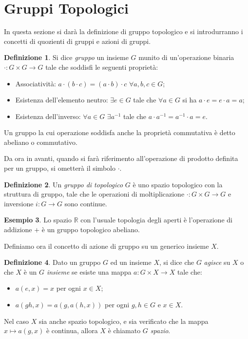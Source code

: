 \documentclass[12pt,a4paper]{report}
\theoremstyle{definition}
\newtheorem{Def}{Definizione}[chapter]
\theoremstyle{definition}
\newtheorem{Ex}[Def]{Esempio}
\theoremstyle{definition}
\theoremstyle{remark}
\begin{document}
\section{Gruppi Topologici}
In questa sezione si darà la definizione di gruppo topologico e si introdurranno i concetti di quozienti di gruppi e azioni di gruppi.
\begin{Def}
	Si dice \textit{gruppo} un insieme $G$ munito di un'operazione binaria $\cdot:G\times G\rightarrow G$ tale che soddisfi le seguenti proprietà:
	\begin{itemize}
		\item Associatività: $a\cdot (b\cdot c)=(a\cdot b)\cdot c$ $\forall a,b,c\in G$;
		\item Esistenza dell'elemento neutro: $\exists e\in G$ tale che $\forall a\in G$ si ha $a\cdot e=e\cdot a=a$;
		\item Esistenza dell'inverso: $\forall a\in G$ $\exists a^{-1}$ tale che $a\cdot a^{-1}=a^{-1}\cdot a=e$.
	\end{itemize}
	Un gruppo la cui operazione soddisfa anche la proprietà commutativa è detto abeliano o commutativo.
\end{Def}
Da ora in avanti, quando si farà riferimento all'operazione di prodotto definita per un gruppo, si ometterà il simbolo $\cdot$.\\
\begin{Def}
	Un \textit{gruppo di topologico} $G$ è uno spazio topologico con la struttura di gruppo, tale che le operazioni di moltiplicazione $\cdot:G\times G\rightarrow G$ e inversione $i:G\rightarrow G$ sono continue.
\end{Def}
\begin{Ex}
	Lo spazio $\mathbb{R}$ con l'usuale topologia degli aperti è l'operazione di addizione $+$ è un gruppo topologico abeliano.
\end{Ex}
Definiamo ora il concetto di azione di gruppo su un generico insieme $X$.
\begin{Def}
	Dato un gruppo $G$ ed un insieme $X$, si dice che $G$ \textit{agisce} su $X$ o che $X$ è un \textit{$G$ insieme} se esiste una mappa $a:G\times X\rightarrow X$ tale che:
	\begin{itemize}
		\item 	$a(e,x)=x$ per ogni $x\in X$;
		\item $a(gh,x)=a(g,a(h,x))$ per ogni $g,h\in G$ e $x\in X$.
	\end{itemize} 
Nel caso $X$ sia anche spazio topologico, e sia verificato che la mappa $x\longmapsto a(g,x)$ è continua, allora $X$ è chiamato \textit{$G$ spazio}.
\end{Def}
\end{document}
